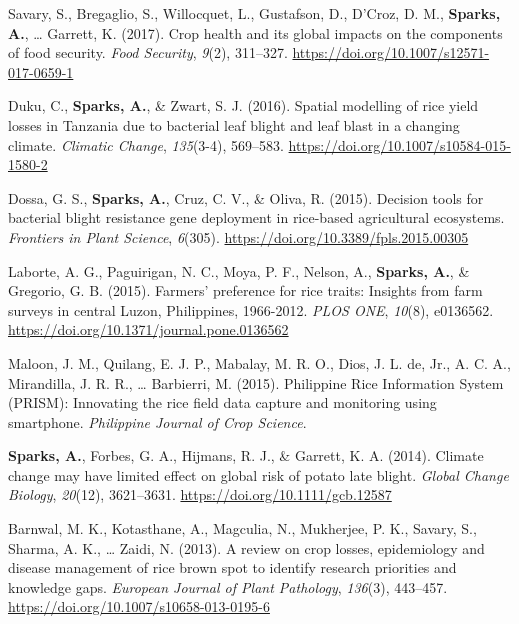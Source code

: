 \documentclass[11pt, a4paper]{awesome-cv}
\begin{document}
\leavevmode\hypertarget{ref-Savary2017}{}%
Savary, S., Bregaglio, S., Willocquet, L., Gustafson, D., D'Croz, D. M., \textbf{Sparks, A.}, \ldots{} Garrett, K. (2017). Crop health and its global impacts on the components of food security. \emph{Food Security}, \emph{9}(2), 311--327. \url{https://doi.org/10.1007/s12571-017-0659-1}

\leavevmode\hypertarget{ref-Duku2016}{}%
Duku, C., \textbf{Sparks, A.}, \& Zwart, S. J. (2016). Spatial modelling of rice yield losses in Tanzania due to bacterial leaf blight and leaf blast in a changing climate. \emph{Climatic Change}, \emph{135}(3-4), 569--583. \url{https://doi.org/10.1007/s10584-015-1580-2}

\leavevmode\hypertarget{ref-Dossa2015}{}%
Dossa, G. S., \textbf{Sparks, A.}, Cruz, C. V., \& Oliva, R. (2015). Decision tools for bacterial blight resistance gene deployment in rice-based agricultural ecosystems. \emph{Frontiers in Plant Science}, \emph{6}(305). \url{https://doi.org/10.3389/fpls.2015.00305}

\leavevmode\hypertarget{ref-Laborte2015}{}%
Laborte, A. G., Paguirigan, N. C., Moya, P. F., Nelson, A., \textbf{Sparks, A.}, \& Gregorio, G. B. (2015). Farmers' preference for rice traits: Insights from farm surveys in central Luzon, Philippines, 1966-2012. \emph{PLOS ONE}, \emph{10}(8), e0136562. \url{https://doi.org/10.1371/journal.pone.0136562}

\leavevmode\hypertarget{ref-Maloon2015}{}%
Maloon, J. M., Quilang, E. J. P., Mabalay, M. R. O., Dios, J. L. de, Jr., A. C. A., Mirandilla, J. R. R., \ldots{} Barbierri, M. (2015). Philippine Rice Information System (PRISM): Innovating the rice field data capture and monitoring using smartphone. \emph{Philippine Journal of Crop Science}.

\leavevmode\hypertarget{ref-Sparks2014}{}%
\textbf{Sparks, A.}, Forbes, G. A., Hijmans, R. J., \& Garrett, K. A. (2014). Climate change may have limited effect on global risk of potato late blight. \emph{Global Change Biology}, \emph{20}(12), 3621--3631. \url{https://doi.org/10.1111/gcb.12587}

\leavevmode\hypertarget{ref-Barnwal2013}{}%
Barnwal, M. K., Kotasthane, A., Magculia, N., Mukherjee, P. K., Savary, S., Sharma, A. K., \ldots{} Zaidi, N. (2013). A review on crop losses, epidemiology and disease management of rice brown spot to identify research priorities and knowledge gaps. \emph{European Journal of Plant Pathology}, \emph{136}(3), 443--457. \url{https://doi.org/10.1007/s10658-013-0195-6}
\end{document}
